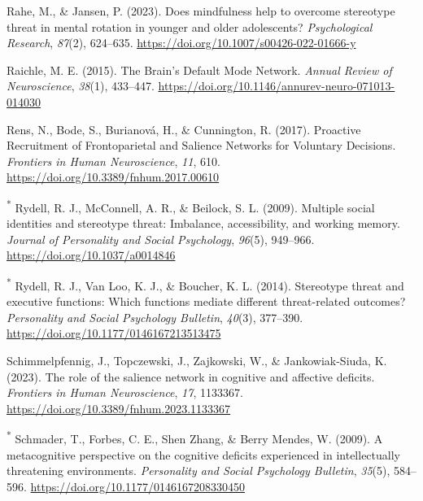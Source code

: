 \documentclass[
  stu, a4paper,floatsintext]{apa7}
\newlength{\cslhangindent}
\newenvironment{CSLReferences}[2] %
 {\begin{list}{}{%
  \setlength{\itemindent}{0pt}
  \setlength{\leftmargin}{0pt}
  \setlength{\parsep}{0pt}
  \ifodd #1
   \setlength{\leftmargin}{\cslhangindent}
   \setlength{\itemindent}{-1\cslhangindent}
  \fi
  \setlength{\itemsep}{#2\baselineskip}}}
 {\end{list}}
\begin{document}
\begin{CSLReferences}{1}{0}
Rahe, M., \& Jansen, P. (2023). Does mindfulness help to overcome stereotype threat in mental rotation in younger and older adolescents? \emph{Psychological Research}, \emph{87}(2), 624--635. \url{https://doi.org/10.1007/s00426-022-01666-y}

Raichle, M. E. (2015). The {Brain}'s {Default Mode Network}. \emph{Annual Review of Neuroscience}, \emph{38}(1), 433--447. \url{https://doi.org/10.1146/annurev-neuro-071013-014030}

Rens, N., Bode, S., Burianová, H., \& Cunnington, R. (2017). Proactive {Recruitment} of {Frontoparietal} and {Salience Networks} for {Voluntary Decisions}. \emph{Frontiers in Human Neuroscience}, \emph{11}, 610. \url{https://doi.org/10.3389/fnhum.2017.00610}

\textsuperscript{*} Rydell, R. J., McConnell, A. R., \& Beilock, S. L. (2009). Multiple social identities and stereotype threat: {Imbalance}, accessibility, and working memory. \emph{Journal of Personality and Social Psychology}, \emph{96}(5), 949--966. \url{https://doi.org/10.1037/a0014846}

\textsuperscript{*} Rydell, R. J., Van Loo, K. J., \& Boucher, K. L. (2014). Stereotype threat and executive functions: {Which} functions mediate different threat-related outcomes? \emph{Personality and Social Psychology Bulletin}, \emph{40}(3), 377--390. \url{https://doi.org/10.1177/0146167213513475}

Schimmelpfennig, J., Topczewski, J., Zajkowski, W., \& Jankowiak-Siuda, K. (2023). The role of the salience network in cognitive and affective deficits. \emph{Frontiers in Human Neuroscience}, \emph{17}, 1133367. \url{https://doi.org/10.3389/fnhum.2023.1133367}

\textsuperscript{*} Schmader, T., Forbes, C. E., Shen Zhang, \& Berry Mendes, W. (2009). A metacognitive perspective on the cognitive deficits experienced in intellectually threatening environments. \emph{Personality and Social Psychology Bulletin}, \emph{35}(5), 584--596. \url{https://doi.org/10.1177/0146167208330450}


\end{CSLReferences}
\end{document}
